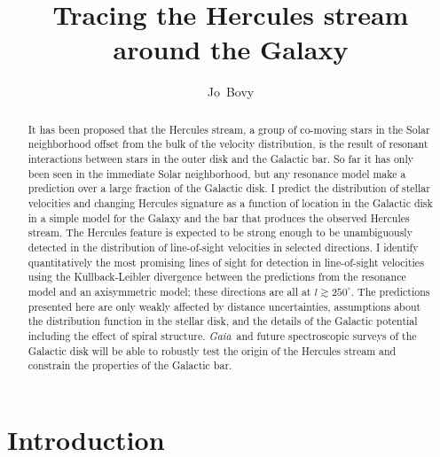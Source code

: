 \documentclass[12pt,preprint]{aastex}
\newcommand{\Gaia}{\emph{Gaia}}
\begin{document}
\title{Tracing the Hercules stream around the Galaxy}
\author{Jo~Bovy}%

\begin{abstract}
It has been proposed that the Hercules stream, a group of co-moving
stars in the Solar neighborhood offset from the bulk of the velocity
distribution, is the result of resonant interactions between stars in
the outer disk and the Galactic bar. So far it has only been seen in
the immediate Solar neighborhood, but any resonance model make a
prediction over a large fraction of the Galactic disk. I predict the
distribution of stellar velocities and changing Hercules signature as
a function of location in the Galactic disk in a simple model for the
Galaxy and the bar that produces the observed Hercules stream. The
Hercules feature is expected to be strong enough to be unambiguously
detected in the distribution of line-of-sight velocities in selected
directions. I identify quantitatively the most promising lines of
sight for detection in line-of-sight velocities using the
Kullback-Leibler divergence between the predictions from the resonance
model and an axisymmetric model; these directions are all at $l
\gtrsim 250^{\circ}$. The predictions presented here are only weakly
affected by distance uncertainties, assumptions about the distribution
function in the stellar disk, and the details of the Galactic
potential including the effect of spiral structure. \Gaia\ and future
spectroscopic surveys of the Galactic disk will be able to robustly
test the origin of the Hercules stream and constrain the properties of
the Galactic bar.
\end{abstract}


\section{Introduction}
\end{document}
